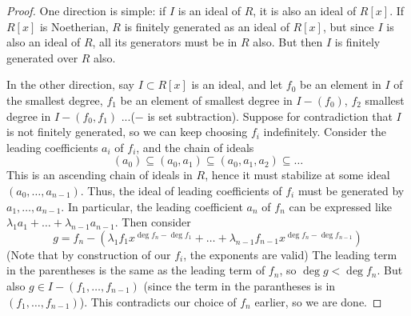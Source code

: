 \documentclass[12pt]{article}
\begin{document}
    \begin{proof}
        One direction is simple: if $I$ is an ideal of $R$, it is also an ideal of $R[x]$. If $R[x]$ is Noetherian, $R$ is finitely generated as an ideal of $R[x]$, but since $I$ is also an ideal of $R$, all its generators must be in $R$ also. But then $I$ is finitely generated over $R$ also. \par 
        In the other direction, say $I \subset R[x]$ is an ideal, and let $f_0$ be an element in $I$ of the smallest degree, $f_1$ be an element of smallest degree in $I - (f_0)$, $f_2$ smallest degree in $I - (f_0, f_1)$ ...($-$ is set subtraction). Suppose for contradiction that $I$ is not finitely generated, so we can keep choosing $f_i$ indefinitely. Consider the leading coefficients $a_i$ of $f_i$, and the chain of ideals 
        $$(a_0) \subseteq (a_0, a_1) \subseteq (a_0, a_1, a_2) \subseteq \dots$$
        This is an ascending chain of ideals in $R$, hence it must stabilize at some ideal $(a_0, \dots, a_{n-1})$. Thus, the ideal of leading coefficients of $f_i$ must be generated by $a_1, \dots, a_{n-1}$. In particular, the leading coefficient $a_{n}$ of $f_{n}$ can be expressed like $\lambda_1 a_1 + \dots + \lambda_{n-1} a_{n-1}$.
        Then consider
        $$g = f_{n} - (\lambda_1 f_1 x^{\deg f_{n} - \deg f_1} + \dots + \lambda_{n-1} f_{n-1} x^{\deg f_{n} - \deg f_{n-1}})$$
        (Note that by construction of our $f_i$, the exponents are valid) The leading term in the parentheses is the same as the leading term of $f_{n}$, so $\deg g < \deg f_{n}$. But also $g \in I - (f_1, \dots, f_{n-1})$ (since the term in the parantheses is in $(f_1, \dots, f_{n-1})$). This contradicts our choice of $f_n$ earlier, so we are done. 
    \end{proof}
\end{document}
